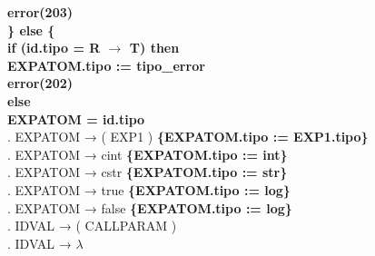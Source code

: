 \begin{tabbing}
    \> \> \> \> \textbf{error(203)}\\
    \> \> \textbf{\} else \{}\\
    \> \> \> \textbf{if (id.tipo = R $\rightarrow$ T) then}\\
    \> \> \> \> \textbf{EXPATOM.tipo := tipo\_error}\\
    \> \> \> \> \textbf{error(202)}\\
    \> \> \> \textbf{else}\\
    \> \> \> \> \textbf{EXPATOM = id.tipo}\\
    . EXPATOM → ( EXP1 ) \>\textbf{\{EXPATOM.tipo := EXP1.tipo\}}\\
    . EXPATOM → cint \>\textbf{\{EXPATOM.tipo := int\}}\\
    . EXPATOM → cstr \>\textbf{\{EXPATOM.tipo := str\}}\\
    . EXPATOM → true \>\textbf{\{EXPATOM.tipo := log\}}\\
    . EXPATOM → false \>\textbf{\{EXPATOM.tipo := log\}}\\
    . IDVAL → ( CALLPARAM )\\
    . IDVAL → $\lambda$\\
\end{tabbing}